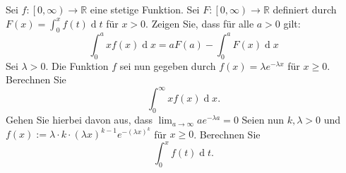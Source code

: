 \newcommand{\woche}{}
\newcommand{\nr}{1}
\newcommand{\thema}{}


\begin{Exercise}
Sei $f\colon\left[0,\infty\right)\to\mathbb{R}$ eine stetige Funktion. Sei $F\colon \left[0,\infty\right)\to \mathbb{R}$ definiert durch $F(x)=\int_0^xf(t)\operatorname{d}t$ für $x>0$.
\Question Zeigen Sie, dass für alle $a>0$ gilt:
\begin{equation*}
	\int_0^{a}xf(x)\operatorname{d}x=aF(a)-\int_0^{a}F(x)\operatorname{d}x
\end{equation*}
\Question Sei $\lambda>0$. Die Funktion $f$ sei nun gegeben durch $f(x)=\lambda e^{-\lambda x}$ für $x\geq 0$. Berechnen Sie 
\begin{equation*}
	\int_0^\infty xf(x)\operatorname{d}x.
\end{equation*}
Gehen Sie hierbei davon aus, dass $\lim_{a\to\infty}ae^{-\lambda a}=0$
\Question Seien nun $k,\lambda >0$ und $f(x):=\lambda\cdot k\cdot  (\lambda x)^{k-1}e^{-(\lambda x)^k}$ für $x\geq 0$. Berechnen Sie
\begin{equation*}
	\int_0^xf(t)\operatorname{d}t.
\end{equation*}
\end{Exercise}
